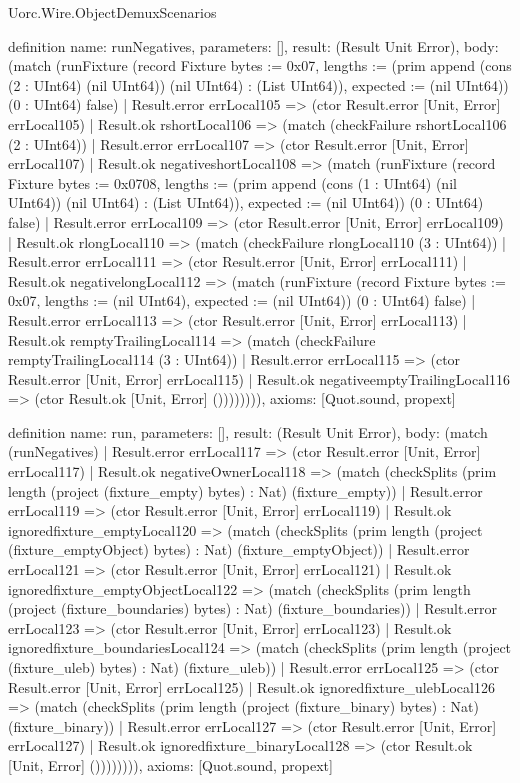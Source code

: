 \begin{lexlean}{Uorc.Wire.ObjectDemuxScenarios}
\begin{semanticmodule}
definition{
  name: runNegatives,
  parameters: [],
  result: (Result Unit Error),
  body: (match (runFixture (record Fixture {bytes := 0x07, lengths := (prim append (cons (2 : UInt64) (nil UInt64)) (nil UInt64) : (List UInt64)), expected := (nil UInt64)}) (0 : UInt64) false)
    | Result.error errLocal105 => (ctor Result.error [Unit, Error] errLocal105)
    | Result.ok rshortLocal106 => (match (checkFailure rshortLocal106 (2 : UInt64))
      | Result.error errLocal107 => (ctor Result.error [Unit, Error] errLocal107)
      | Result.ok negativeshortLocal108 => (match (runFixture (record Fixture {bytes := 0x0708, lengths := (prim append (cons (1 : UInt64) (nil UInt64)) (nil UInt64) : (List UInt64)), expected := (nil UInt64)}) (0 : UInt64) false)
        | Result.error errLocal109 => (ctor Result.error [Unit, Error] errLocal109)
        | Result.ok rlongLocal110 => (match (checkFailure rlongLocal110 (3 : UInt64))
          | Result.error errLocal111 => (ctor Result.error [Unit, Error] errLocal111)
          | Result.ok negativelongLocal112 => (match (runFixture (record Fixture {bytes := 0x07, lengths := (nil UInt64), expected := (nil UInt64)}) (0 : UInt64) false)
            | Result.error errLocal113 => (ctor Result.error [Unit, Error] errLocal113)
            | Result.ok remptyTrailingLocal114 => (match (checkFailure remptyTrailingLocal114 (3 : UInt64))
              | Result.error errLocal115 => (ctor Result.error [Unit, Error] errLocal115)
              | Result.ok negativeemptyTrailingLocal116 => (ctor Result.ok [Unit, Error] ()))))))),
  axioms: [Quot.sound, propext]
}

definition{
  name: run,
  parameters: [],
  result: (Result Unit Error),
  body: (match (runNegatives)
    | Result.error errLocal117 => (ctor Result.error [Unit, Error] errLocal117)
    | Result.ok negativeOwnerLocal118 => (match (checkSplits (prim length (project (fixture_empty) bytes) : Nat) (fixture_empty))
      | Result.error errLocal119 => (ctor Result.error [Unit, Error] errLocal119)
      | Result.ok ignoredfixture_emptyLocal120 => (match (checkSplits (prim length (project (fixture_emptyObject) bytes) : Nat) (fixture_emptyObject))
        | Result.error errLocal121 => (ctor Result.error [Unit, Error] errLocal121)
        | Result.ok ignoredfixture_emptyObjectLocal122 => (match (checkSplits (prim length (project (fixture_boundaries) bytes) : Nat) (fixture_boundaries))
          | Result.error errLocal123 => (ctor Result.error [Unit, Error] errLocal123)
          | Result.ok ignoredfixture_boundariesLocal124 => (match (checkSplits (prim length (project (fixture_uleb) bytes) : Nat) (fixture_uleb))
            | Result.error errLocal125 => (ctor Result.error [Unit, Error] errLocal125)
            | Result.ok ignoredfixture_ulebLocal126 => (match (checkSplits (prim length (project (fixture_binary) bytes) : Nat) (fixture_binary))
              | Result.error errLocal127 => (ctor Result.error [Unit, Error] errLocal127)
              | Result.ok ignoredfixture_binaryLocal128 => (ctor Result.ok [Unit, Error] ()))))))),
  axioms: [Quot.sound, propext]
}
\end{semanticmodule}
\end{lexlean}
